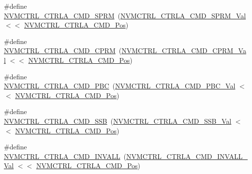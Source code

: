 \begin{DoxyCompactItemize}
\item 
\#define \mbox{\hyperlink{group___s_a_m_d21___n_v_m_c_t_r_l_gaaa9412be92f5cb4cbf868ce2532930aa}{N\+V\+M\+C\+T\+R\+L\+\_\+\+C\+T\+R\+L\+A\+\_\+\+C\+M\+D\+\_\+\+S\+P\+RM}}~(\mbox{\hyperlink{group___s_a_m_d21___n_v_m_c_t_r_l_ga5e5184e115f92e2037793f468f07e912}{N\+V\+M\+C\+T\+R\+L\+\_\+\+C\+T\+R\+L\+A\+\_\+\+C\+M\+D\+\_\+\+S\+P\+R\+M\+\_\+\+Val}}    $<$$<$ \mbox{\hyperlink{group___s_a_m_d21___n_v_m_c_t_r_l_ga5346c6f8ba695f7cadb7f07bde6e25f8}{N\+V\+M\+C\+T\+R\+L\+\_\+\+C\+T\+R\+L\+A\+\_\+\+C\+M\+D\+\_\+\+Pos}})
\item 
\#define \mbox{\hyperlink{group___s_a_m_d21___n_v_m_c_t_r_l_ga682f47adcc9972101304cccbc5c112bd}{N\+V\+M\+C\+T\+R\+L\+\_\+\+C\+T\+R\+L\+A\+\_\+\+C\+M\+D\+\_\+\+C\+P\+RM}}~(\mbox{\hyperlink{group___s_a_m_d21___n_v_m_c_t_r_l_ga5af4406a70755e9869cbddf9aeccba45}{N\+V\+M\+C\+T\+R\+L\+\_\+\+C\+T\+R\+L\+A\+\_\+\+C\+M\+D\+\_\+\+C\+P\+R\+M\+\_\+\+Val}}    $<$$<$ \mbox{\hyperlink{group___s_a_m_d21___n_v_m_c_t_r_l_ga5346c6f8ba695f7cadb7f07bde6e25f8}{N\+V\+M\+C\+T\+R\+L\+\_\+\+C\+T\+R\+L\+A\+\_\+\+C\+M\+D\+\_\+\+Pos}})
\item 
\#define \mbox{\hyperlink{group___s_a_m_d21___n_v_m_c_t_r_l_ga99e7d43b40b4c0db731bae7c936af4a4}{N\+V\+M\+C\+T\+R\+L\+\_\+\+C\+T\+R\+L\+A\+\_\+\+C\+M\+D\+\_\+\+P\+BC}}~(\mbox{\hyperlink{group___s_a_m_d21___n_v_m_c_t_r_l_gaa88d2aeae32e10443a0e9dc516dfbf44}{N\+V\+M\+C\+T\+R\+L\+\_\+\+C\+T\+R\+L\+A\+\_\+\+C\+M\+D\+\_\+\+P\+B\+C\+\_\+\+Val}}     $<$$<$ \mbox{\hyperlink{group___s_a_m_d21___n_v_m_c_t_r_l_ga5346c6f8ba695f7cadb7f07bde6e25f8}{N\+V\+M\+C\+T\+R\+L\+\_\+\+C\+T\+R\+L\+A\+\_\+\+C\+M\+D\+\_\+\+Pos}})
\item 
\#define \mbox{\hyperlink{group___s_a_m_d21___n_v_m_c_t_r_l_ga7c3505981ea288eb37c268fbe5320d36}{N\+V\+M\+C\+T\+R\+L\+\_\+\+C\+T\+R\+L\+A\+\_\+\+C\+M\+D\+\_\+\+S\+SB}}~(\mbox{\hyperlink{group___s_a_m_d21___n_v_m_c_t_r_l_ga9192307a9292a8144f18adfe8ea0d3f0}{N\+V\+M\+C\+T\+R\+L\+\_\+\+C\+T\+R\+L\+A\+\_\+\+C\+M\+D\+\_\+\+S\+S\+B\+\_\+\+Val}}     $<$$<$ \mbox{\hyperlink{group___s_a_m_d21___n_v_m_c_t_r_l_ga5346c6f8ba695f7cadb7f07bde6e25f8}{N\+V\+M\+C\+T\+R\+L\+\_\+\+C\+T\+R\+L\+A\+\_\+\+C\+M\+D\+\_\+\+Pos}})
\item 
\#define \mbox{\hyperlink{group___s_a_m_d21___n_v_m_c_t_r_l_gafdd1495fff0fe785746334cb2b902409}{N\+V\+M\+C\+T\+R\+L\+\_\+\+C\+T\+R\+L\+A\+\_\+\+C\+M\+D\+\_\+\+I\+N\+V\+A\+LL}}~(\mbox{\hyperlink{group___s_a_m_d21___n_v_m_c_t_r_l_ga0bef792b0234a40587a3dd7254e1764d}{N\+V\+M\+C\+T\+R\+L\+\_\+\+C\+T\+R\+L\+A\+\_\+\+C\+M\+D\+\_\+\+I\+N\+V\+A\+L\+L\+\_\+\+Val}}  $<$$<$ \mbox{\hyperlink{group___s_a_m_d21___n_v_m_c_t_r_l_ga5346c6f8ba695f7cadb7f07bde6e25f8}{N\+V\+M\+C\+T\+R\+L\+\_\+\+C\+T\+R\+L\+A\+\_\+\+C\+M\+D\+\_\+\+Pos}})
$$
\end{DoxyCompactItemize}
